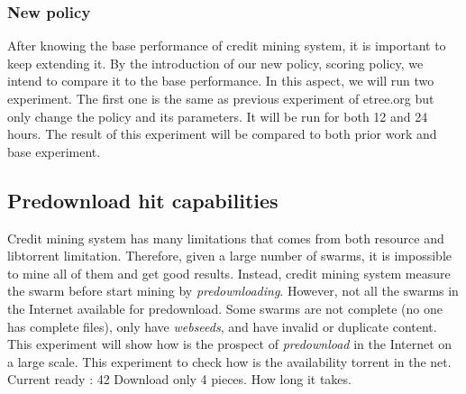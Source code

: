 
\subsubsection{New policy}
After knowing the base performance of credit mining system, it is important to keep extending it. By the introduction of our new policy, scoring policy, we intend to compare it to the base performance. In this aspect, we will run two experiment. The first one is the same as previous experiment of etree.org but only change the policy and its parameters. It will be run for both 12 and 24 hours. The result of this experiment will be compared to both prior work and base experiment. 


\subsection{Predownload hit capabilities}
Credit mining system has many limitations that comes from both resource and libtorrent limitation. Therefore, given a large number of swarms, it is impossible to mine all of them and get good results. Instead, credit mining system measure the swarm before start mining by \textit{predownloading}. However, not all the swarms in the Internet available for predownload. Some swarms are not complete (no one has complete files), only have \textit{webseeds}, and have invalid or duplicate content. This experiment will show how is the prospect of \textit{predownload} in the Internet on a large scale. 
This experiment to check how is the availability torrent in the net. Current ready : 42
Download only 4 pieces. How long it takes.

